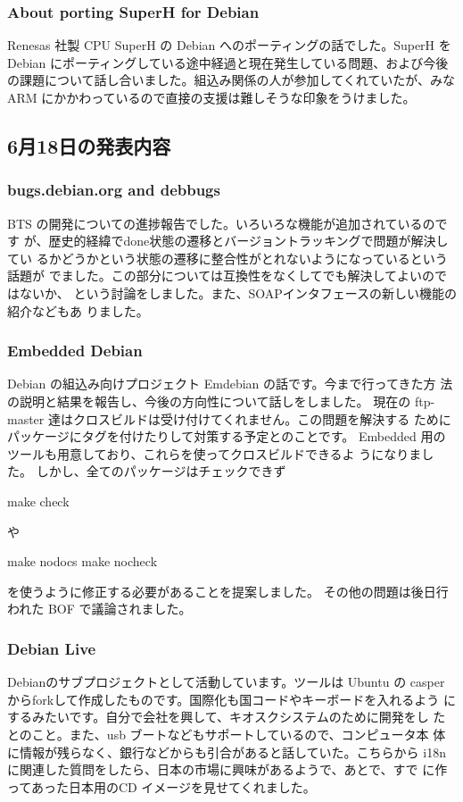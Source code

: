 \documentclass[mingoth,a4paper]{jsarticle}
\begin{document}
\subsubsection{About porting SuperH for Debian}
  Renesas 社製 CPU SuperH の Debian へのポーティングの話でした。SuperH を 
  Debian にポーティングしている途中経過と現在発生している問題、および今後
  の課題について話し合いました。組込み関係の人が参加してくれていたが、みな 
  ARM にかかわっているので直接の支援は難しそうな印象をうけました。

\subsection{6月18日の発表内容}

\subsubsection{bugs.debian.org and debbugs}

BTS の開発についての進捗報告でした。いろいろな機能が追加されているのです
が、歴史的経緯でdone状態の遷移とバージョントラッキングで問題が解決してい
るかどうかという状態の遷移に整合性がとれないようになっているという話題が
でました。この部分については互換性をなくしてでも解決してよいのではないか、
という討論をしました。また、SOAPインタフェースの新しい機能の紹介などもあ
りました。

\subsubsection{Embedded Debian}

  Debian の組込み向けプロジェクト Emdebian の話です。今まで行ってきた方
  法の説明と結果を報告し、今後の方向性について話しをしました。 現在の 
  ftp-master 達はクロスビルドは受け付けてくれません。この問題を解決する
  ためにパッケージにタグを付けたりして対策する予定とのことです。
  Embedded 用のツールも用意しており、これらを使ってクロスビルドできるよ
  うになりました。 しかし、全てのパッケージはチェックできず
  \begin{commandline}
  make check
  \end{commandline}
  や
  \begin{commandline}
  make nodocs
  make nocheck
  \end{commandline}
  を使うように修正する必要があることを提案しました。
  その他の問題は後日行われた BOF で議論されました。

\subsubsection{Debian Live}
 Debianのサブプロジェクトとして活動しています。ツールは Ubuntu の casper 
 からforkして作成したものです。国際化も国コードやキーボードを入れるよう
 にするみたいです。自分で会社を興して、キオスクシステムのために開発をし
 たとのこと。また、usb ブートなどもサポートしているので、コンピュータ本
 体に情報が残らなく、銀行などからも引合があると話していた。こちらから
 i18nに関連した質問をしたら、日本の市場に興味があるようで、あとで、すで
 に作ってあった日本用のCD イメージを見せてくれました。
\end{document}
